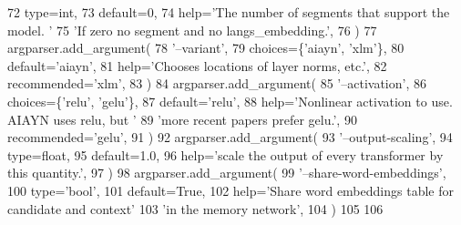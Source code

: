 \begin{DoxyCode}
72         type=int,
73         default=0,
74         help=\textcolor{stringliteral}{'The number of segments that support the model. '}
75         \textcolor{stringliteral}{'If zero no segment and no langs\_embedding.'},
76     )
77     argparser.add\_argument(
78         \textcolor{stringliteral}{'--variant'},
79         choices=\{\textcolor{stringliteral}{'aiayn'}, \textcolor{stringliteral}{'xlm'}\},
80         default=\textcolor{stringliteral}{'aiayn'},
81         help=\textcolor{stringliteral}{'Chooses locations of layer norms, etc.'},
82         recommended=\textcolor{stringliteral}{'xlm'},
83     )
84     argparser.add\_argument(
85         \textcolor{stringliteral}{'--activation'},
86         choices=\{\textcolor{stringliteral}{'relu'}, \textcolor{stringliteral}{'gelu'}\},
87         default=\textcolor{stringliteral}{'relu'},
88         help=\textcolor{stringliteral}{'Nonlinear activation to use. AIAYN uses relu, but '}
89         \textcolor{stringliteral}{'more recent papers prefer gelu.'},
90         recommended=\textcolor{stringliteral}{'gelu'},
91     )
92     argparser.add\_argument(
93         \textcolor{stringliteral}{'--output-scaling'},
94         type=float,
95         default=1.0,
96         help=\textcolor{stringliteral}{'scale the output of every transformer by this quantity.'},
97     )
98     argparser.add\_argument(
99         \textcolor{stringliteral}{'--share-word-embeddings'},
100         type=\textcolor{stringliteral}{'bool'},
101         default=\textcolor{keyword}{True},
102         help=\textcolor{stringliteral}{'Share word embeddings table for candidate and context'}
103         \textcolor{stringliteral}{'in the memory network'},
104     )
105 
106 
\end{DoxyCode}
